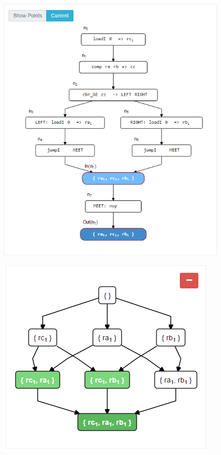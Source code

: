 \documentclass[bsc,twoside,singlespacing,parskip,logo,notimes,normalheadings]{infthesis}
\begin{document}
        \begin{figure}[!h]
          \begin{minipage}{.58\textwidth}
            \centering
            \includegraphics[width=\textwidth]{img/cfg-vis.png}
            \label{fig:cfg-vis}
          \end{minipage}
          \quad
          \begin{minipage}{.38\textwidth}
            \centering
            \includegraphics[width=\textwidth, trim=0 0 0 60]{img/lattice.png}

\end{minipage}
\end{figure}
\end{document}
